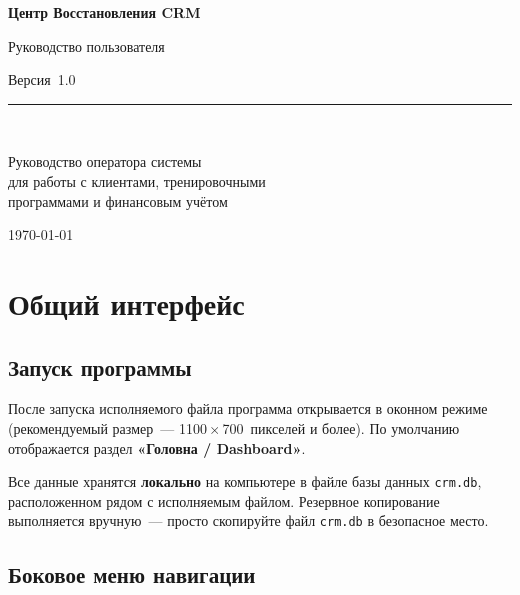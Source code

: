 \documentclass[12pt,a4paper]{article}
\begin{document}
\begin{titlepage}
  \centering
  \vspace*{4cm}
  {\Huge\bfseries Центр Восстановления CRM\par}
  \vspace{1cm}
  {\LARGE Руководство пользователя\par}
  \vspace{0.5cm}
  {\large Версия~1.0\par}
  \vspace{3cm}
  \rule{0.6\textwidth}{1pt}\\[0.4cm]
  {\large Руководство оператора системы\\[4pt]
  для работы с клиентами, тренировочными\\[2pt]
  программами и финансовым учётом\par}
  \vfill
  {\small\today\par}
\end{titlepage}

\tableofcontents
\newpage

\section{Общий интерфейс}

\subsection{Запуск программы}

После запуска исполняемого файла программа открывается в оконном режиме
(рекомендуемый размер~--- 1100\,$\times$\,700~пикселей и более).
По умолчанию отображается раздел \textbf{«Головна / Dashboard»}.

Все данные хранятся \textbf{локально} на компьютере в файле базы данных
\texttt{crm.db}, расположенном рядом с исполняемым файлом.
Резервное копирование выполняется вручную~--- просто скопируйте файл
\texttt{crm.db} в безопасное место.

\subsection{Боковое меню навигации}
\end{document}
